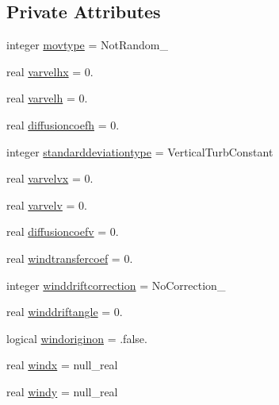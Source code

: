 \subsection*{Private Attributes}
\begin{DoxyCompactItemize}
\item 
integer \mbox{\hyperlink{structmodulelagrangianglobal_1_1t__movement_a10e7d36cee1de52767c8a1baa77c4dfe}{movtype}} = Not\+Random\+\_\+
\item 
real \mbox{\hyperlink{structmodulelagrangianglobal_1_1t__movement_ad93427a115d83e34aba88b6ba1ad269a}{varvelhx}} = 0.
\item 
real \mbox{\hyperlink{structmodulelagrangianglobal_1_1t__movement_a82709f914be7af1f407f9242b8f70e03}{varvelh}} = 0.
\item 
real \mbox{\hyperlink{structmodulelagrangianglobal_1_1t__movement_a4505ac8b1aa3cea549cac997dcb62843}{diffusioncoefh}} = 0.
\item 
integer \mbox{\hyperlink{structmodulelagrangianglobal_1_1t__movement_a93c649ae892b9aad139de83e5ee20902}{standarddeviationtype}} = Vertical\+Turb\+Constant
\item 
real \mbox{\hyperlink{structmodulelagrangianglobal_1_1t__movement_ae4fd945974ef6e73b074423b170d41fe}{varvelvx}} = 0.
\item 
real \mbox{\hyperlink{structmodulelagrangianglobal_1_1t__movement_a3d8bc6f9bbaf3d6c5aac0516dde83ece}{varvelv}} = 0.
\item 
real \mbox{\hyperlink{structmodulelagrangianglobal_1_1t__movement_a6b7ad7ced1e6a7797c7e17832b559a41}{diffusioncoefv}} = 0.
\item 
real \mbox{\hyperlink{structmodulelagrangianglobal_1_1t__movement_ad78b69d372061d9eea06e6b58f3f50d9}{windtransfercoef}} = 0.
\item 
integer \mbox{\hyperlink{structmodulelagrangianglobal_1_1t__movement_a2243e9608591b8f475af3eddc3486d2f}{winddriftcorrection}} = No\+Correction\+\_\+
\item 
real \mbox{\hyperlink{structmodulelagrangianglobal_1_1t__movement_ac77f1c704fbf9caa6689ced3b3f2b203}{winddriftangle}} = 0.
\item 
logical \mbox{\hyperlink{structmodulelagrangianglobal_1_1t__movement_a20d75ac011692e1028d37f0e3b3535ae}{windoriginon}} = .false.
\item 
real \mbox{\hyperlink{structmodulelagrangianglobal_1_1t__movement_afc86340cbdd2a764ba63c28032eb34db}{windx}} = null\+\_\+real
\item 
real \mbox{\hyperlink{structmodulelagrangianglobal_1_1t__movement_ab5c398273735c2fabb6a4299e3023923}{windy}} = null\+\_\+real

\end{DoxyCompactItemize}
